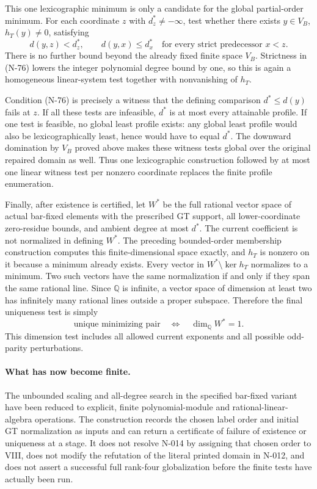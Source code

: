 This one lexicographic minimum is only a candidate for the
global partial-order minimum.  For each coordinate $z$ with
$d^*_z\ne-\infty$, test whether there exists $y\in V_B$,
$h_T(y)\ne0$, satisfying
\[
 d(y,z)<d^*_z,\qquad
 d(y,x)\le d^*_x\quad\text{for every strict predecessor }x<z.
 \tag{N-76}
\]
There is no further bound beyond the already fixed finite
space $V_B$.  Strictness in (N-76) lowers the integer
polynomial degree bound by one, so this is again a
homogeneous linear-system test together with nonvanishing
of $h_T$.

Condition (N-76) is precisely a witness that the defining
comparison $d^*\le d(y)$ fails at $z$.  If all these tests
are infeasible, $d^*$ is at most every attainable profile.
If one test is feasible, no global least profile exists:
any global least profile would also be lexicographically
least, hence would have to equal $d^*$.  The downward
domination by $V_B$ proved above makes these witness tests
global over the original repaired domain as well.  Thus
one lexicographic construction followed by at most one
linear witness test per nonzero coordinate replaces the
finite profile enumeration.

Finally, after existence is certified, let $W^*$ be the
full rational vector space of actual bar-fixed elements
with the prescribed GT support, all lower-coordinate
zero-residue bounds, and ambient degree at most $d^*$.
The current coefficient is not normalized in defining
$W^*$.  The preceding bounded-order membership construction
computes this finite-dimensional space exactly, and
$h_T$ is nonzero on it because a minimum already exists.
Every vector in $W^*\setminus\ker h_T$ normalizes to a
minimum.  Two such vectors have the same normalization
if and only if they span the same rational line.
Since $\mathbb Q$ is infinite, a vector space of dimension
at least two has infinitely many rational lines outside
a proper subspace.  Therefore the final uniqueness test is
simply
\[
                 \text{unique minimizing pair}
                    \quad\Longleftrightarrow\quad
                 \dim_{\mathbb Q}W^*=1.
 \tag{N-77}
\]
This dimension test includes all allowed current exponents
and all possible odd-parity perturbations.

\paragraph{What has now become finite.}
The unbounded scaling and all-degree search in the specified
bar-fixed variant have been reduced to explicit, finite
polynomial-module and rational-linear-algebra operations.
The construction records the chosen label order and initial
GT normalization as inputs and can return a certificate of
failure of existence or uniqueness at a stage.  It does
not resolve N-014 by assigning that chosen order to VIII,
does not modify the refutation of the literal printed
domain in N-012, and does not assert a successful full
rank-four globalization before the finite tests have
actually been run.


